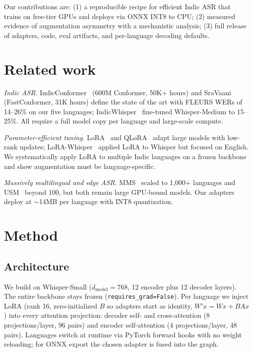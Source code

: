 \documentclass[9pt,a4paper,twocolumn]{article}
\begin{document}
Our contributions are: (1) a reproducible recipe for efficient Indic ASR that trains on free-tier GPUs and deploys via ONNX INT8 to CPU; (2) measured evidence of augmentation asymmetry with a mechanistic analysis; (3) full release of adapters, code, eval artifacts, and per-language decoding defaults.

\section{Related work}
\textit{Indic ASR.} IndicConformer~\cite{chiu2022indicconformer} (600M Conformer, 50K+ hours) and SraVaani~\cite{pulikodan2026sravaani} (FastConformer, 31K hours) define the state of the art with FLEURS WERs of 14--26\% on our five languages; IndicWhisper~\cite{nandyala2025indicwhisper} fine-tuned Whisper-Medium to 15--25\%. All require a full model copy per language and large-scale compute.

\textit{Parameter-efficient tuning.} LoRA~\cite{hu2022lora} and QLoRA~\cite{dettmers2023qlora} adapt large models with low-rank updates; LoRA-Whisper~\cite{song2024lorawhisper} applied LoRA to Whisper but focused on English. We systematically apply LoRA to multiple Indic languages on a frozen backbone and show augmentation must be language-specific.

\textit{Massively multilingual and edge ASR.} MMS~\cite{pratap2024mms} scaled to 1,000+ languages and USM~\cite{zhang2023usm} beyond 100, but both remain large GPU-bound models. Our adapters deploy at $\sim$14MB per language with INT8 quantization.

\section{Method}
\subsection{Architecture}
We build on Whisper-Small ($d_{\mathrm{model}}{=}768$, 12 encoder plus 12 decoder layers). The entire backbone stays frozen (\texttt{requires\_grad=False}). Per language we inject LoRA (rank 16, zero-initialized $B$ so adapters start as identity, $W'x=Wx+BAx$) into every attention projection: decoder self- and cross-attention (8 projections/layer, 96 pairs) and encoder self-attention (4 projections/layer, 48 pairs). Languages switch at runtime via PyTorch forward hooks with no weight reloading; for ONNX export the chosen adapter is fused into the graph.
\end{document}

